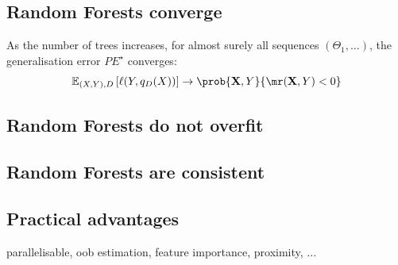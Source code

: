 \documentclass[../main.tex]{subfiles}
\begin{document}
\subsection{Random Forests converge}


As the number of trees increases, for almost surely all sequences $(\Theta_{1}, \dots)$, the generalisation error $PE^\star$ converges:
$$
\mathbb{E}_{(X,Y), D}\left[ \ell(Y, q_{D}(X)) \right]  \to
\prob{\vec{X}, Y}{
\mr(\vec{X}, Y)  < 0
}
$$

\subsection{Random Forests do not overfit}

\subsection{Random Forests are consistent}


\subsection{Practical advantages}
parallelisable, oob estimation, feature importance, proximity, ...
\end{document}
